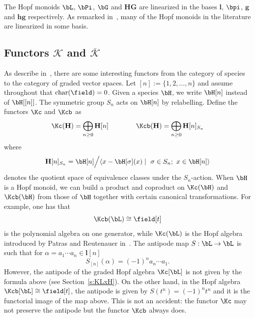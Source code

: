 The Hopf monoids $\bL$, $\bPi$, $\bG$ and $\mathbf{HG}$ are linearized in the bases $\mathbf{l}$, $\bpi$, $\mathbf{g}$ and $\mathbf{hg}$ respectively. As remarked in~\cite{MarbergLin}, many of the Hopf monoids in the literature are linearized in some basis. 

\subsection{Functors \texorpdfstring{$\mathcal{K}$}{K} and \texorpdfstring{$\overline{\mathcal{K}}$}{overline K}} \label{ss:K_Kbar} 
As describe in~\cite[Section~III]{AM:2010}, there are some interesting functors from the category of species to the category of graded vector spaces. Let $[n]:=\{1,2,\ldots,n\}$ and assume throughout that $\text{char}(\field)=0$. Given a species $\bH$, we write $\bH[n]$ instead of $\bH[[n]]$. The symmetric group $S_n$ acts on $\bH[n]$ by relabelling. Define the functors $\Kc$ and $\Kcb$ as
 $$ \Kc(\mathbf{H}) = \bigoplus_{n\ge 0} \mathbf{H}[n]
 \qquad\qquad
 \Kcb(\mathbf{H}) = \bigoplus_{n\ge 0} \mathbf{H}[n]_{S_n}
 $$
where
 $$
 \mathbf{H}[n]_{S_n}={\bH}[n]\Big/ \langle x-{\bH}[\sigma](x) \mid \ \sigma\in S_n; \ x\in {\bH}[n]\rangle
 $$
 denotes the quotient space of equivalence classes under the $S_n$-action. When $\bH$ is a Hopf monoid, 
 we can build a product and coproduct
on $ \Kc({\bH})$ and $ \Kcb({\bH})$ from those of $\bH$ together
with certain canonical transformations.
For example, one has that
\[
\Kcb(\bL)\cong\field[t]
\]
is the polynomial algebra on one generator, while $\Kc(\bL)$
is the Hopf algebra introduced by Patras and Reutenauer in~\cite{PR:2004}. The antipode map $S:\bL\rightarrow\bL$ is such that
for $\alpha=a_1\cdots a_n\in\mathbf{l}[n]$
 $$ S_{[n]}(\alpha)=(-1)^n a_n\cdots a_1.$$
 However, the antipode of the graded Hopf algebra $\Kc[\bL]$ is not given by the formula above (see Section~\ref{s:KLxH}). On the other hand, in the Hopf algebra $\Kcb[\bL]\cong \field[t]$, the antipode is given by $S(t^n)=(-1)^nt^n$ and it is the functorial image of the map above. This is not an accident: the functor $\Kc$ may not preserve the antipode but the functor $\Kcb$ always does.


